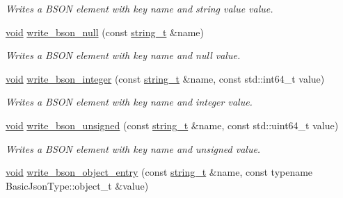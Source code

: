 \begin{DoxyCompactItemize}
\begin{DoxyCompactList}\small\item\em Writes a B\+S\+ON element with key {\itshape name} and string value {\itshape value}. \end{DoxyCompactList}\item 
\hyperlink{namespacenlohmann_1_1detail_a59fca69799f6b9e366710cb9043aa77d}{void} \hyperlink{classnlohmann_1_1detail_1_1binary__writer_a9927c1110b18661e0224a76156e5a7a9}{write\+\_\+bson\+\_\+null} (const \hyperlink{classnlohmann_1_1detail_1_1binary__writer_a29f2ae7a5c4a8c1dae47b3b2310de8a8}{string\+\_\+t} \&name)
\begin{DoxyCompactList}\small\item\em Writes a B\+S\+ON element with key {\itshape name} and null value. \end{DoxyCompactList}\item 
\hyperlink{namespacenlohmann_1_1detail_a59fca69799f6b9e366710cb9043aa77d}{void} \hyperlink{classnlohmann_1_1detail_1_1binary__writer_a553ad4dbdf27238eef90867e4bf2f3e5}{write\+\_\+bson\+\_\+integer} (const \hyperlink{classnlohmann_1_1detail_1_1binary__writer_a29f2ae7a5c4a8c1dae47b3b2310de8a8}{string\+\_\+t} \&name, const std\+::int64\+\_\+t value)
\begin{DoxyCompactList}\small\item\em Writes a B\+S\+ON element with key {\itshape name} and integer {\itshape value}. \end{DoxyCompactList}\item 
\hyperlink{namespacenlohmann_1_1detail_a59fca69799f6b9e366710cb9043aa77d}{void} \hyperlink{classnlohmann_1_1detail_1_1binary__writer_a5e295ed1be6af6260d2a65f7397c3742}{write\+\_\+bson\+\_\+unsigned} (const \hyperlink{classnlohmann_1_1detail_1_1binary__writer_a29f2ae7a5c4a8c1dae47b3b2310de8a8}{string\+\_\+t} \&name, const std\+::uint64\+\_\+t value)
\begin{DoxyCompactList}\small\item\em Writes a B\+S\+ON element with key {\itshape name} and unsigned {\itshape value}. \end{DoxyCompactList}\item 
\hyperlink{namespacenlohmann_1_1detail_a59fca69799f6b9e366710cb9043aa77d}{void} \hyperlink{classnlohmann_1_1detail_1_1binary__writer_a6231302930265eccb3f56c378f7b0661}{write\+\_\+bson\+\_\+object\+\_\+entry} (const \hyperlink{classnlohmann_1_1detail_1_1binary__writer_a29f2ae7a5c4a8c1dae47b3b2310de8a8}{string\+\_\+t} \&name, const typename Basic\+Json\+Type\+::object\+\_\+t \&value)

\end{DoxyCompactItemize}
